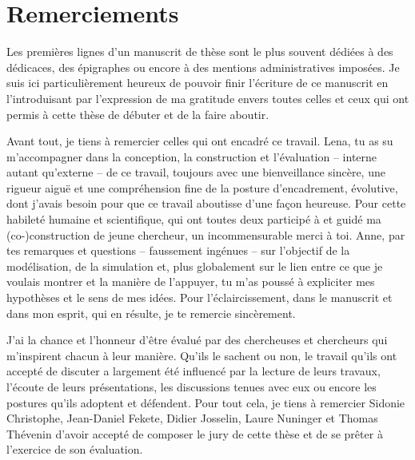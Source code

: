 \chapter*{Remerciements}
Les premières lignes d'un manuscrit de thèse sont le plus souvent dédiées à des dédicaces, des épigraphes ou encore à des mentions administratives imposées.
Je suis ici particulièrement heureux de pouvoir finir l'écriture de ce manuscrit en l'introduisant par l'expression de ma gratitude envers toutes celles et ceux qui ont permis à cette thèse de débuter et de la faire aboutir.

Avant tout, je tiens à remercier celles qui ont encadré ce travail.
Lena, tu as su m'accompagner dans la conception, la construction et l'évaluation -- interne autant qu'externe -- de ce travail, toujours avec une bienveillance sincère, une rigueur aiguë et une compréhension fine de la posture d'encadrement, évolutive, dont j'avais besoin pour que ce travail aboutisse d'une façon heureuse.
Pour cette habileté humaine et scientifique, qui ont toutes deux participé à et guidé ma (co-)construction de jeune chercheur, un \og incommensurable\fg{} merci à toi.
Anne, par tes remarques et questions -- faussement ingénues -- sur l'objectif de la modélisation, de la simulation et, plus globalement sur le lien entre ce que je voulais montrer et la manière de l'appuyer, tu m'as poussé à expliciter mes hypothèses et le sens de mes idées.
Pour l'éclaircissement, dans le manuscrit et dans mon esprit, qui en résulte, je te remercie sincèrement.

J'ai la chance et l'honneur d'être évalué par des chercheuses et chercheurs qui m'inspirent chacun à leur manière.
Qu'ils le sachent ou non, le travail qu'ils ont accepté de discuter a largement été influencé par la lecture de leurs travaux, l'écoute de leurs présentations, les discussions tenues avec eux ou encore les postures qu'ils adoptent et défendent.
Pour tout cela, je tiens à remercier Sidonie Christophe, Jean-Daniel Fekete, Didier Josselin, Laure Nuninger et Thomas Thévenin d'avoir accepté de composer le jury de cette thèse et de se prêter à l'exercice de son évaluation.

